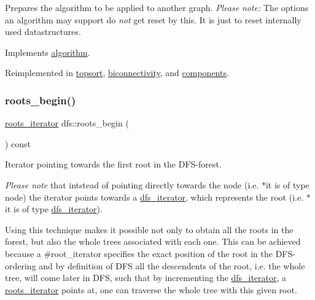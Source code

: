 Prepares the algorithm to be applied to another graph. {\itshape Please} {\itshape note\+:} The options an algorithm may support do {\itshape not} get reset by this. It is just to reset internally used datastructures. 

Implements \mbox{\hyperlink{classalgorithm_aea645f2e39976a477c8f8564656fd1b6}{algorithm}}.



Reimplemented in \mbox{\hyperlink{classtopsort_af93d2f617ceae83ee2a4f9106fbc32c3}{topsort}}, \mbox{\hyperlink{classbiconnectivity_a16d4b175efeff663004ae4cca6faa906}{biconnectivity}}, and \mbox{\hyperlink{classcomponents_a07b6bab5962524ae26ccb478b35cd76c}{components}}.

\mbox{\label{classdfs_af56fa2b736f0b924dba1257e18ba4b61}} 
\subsubsection{\texorpdfstring{roots\+\_\+begin()}{roots\_begin()}}
{\footnotesize\ttfamily \mbox{\hyperlink{classdfs_a17cb59c8a1fead11fa6b0c85cf5a478e}{roots\+\_\+iterator}} dfs\+::roots\+\_\+begin (\begin{DoxyParamCaption}{ }\end{DoxyParamCaption}) const\hspace{0.3cm}{\ttfamily [inline]}}



Iterator pointing towards the first root in the D\+F\+S-\/forest. 

{\itshape Please note} that intstead of pointing directly towards the node (i.\+e. {\ttfamily $\ast$it} is of type node) the iterator points towards a \mbox{\hyperlink{classdfs_ad040ddae37492e18c8e029406d667bd9}{dfs\+\_\+iterator}}, which represents the root (i.\+e. {\ttfamily $\ast$it} is of type \mbox{\hyperlink{classdfs_ad040ddae37492e18c8e029406d667bd9}{dfs\+\_\+iterator}}).

Using this technique makes it possible not only to obtain all the roots in the forest, but also the whole trees associated with each one. This can be achieved because a \#root\+\_\+iterator specifies the exact position of the root in the D\+F\+S-\/ordering and by definition of D\+FS all the descendents of the root, i.\+e. the whole tree, will come later in D\+FS, such that by incrementing the \mbox{\hyperlink{classdfs_ad040ddae37492e18c8e029406d667bd9}{dfs\+\_\+iterator}}, a \mbox{\hyperlink{classdfs_a17cb59c8a1fead11fa6b0c85cf5a478e}{roots\+\_\+iterator}} points at, one can traverse the whole tree with this given root.


